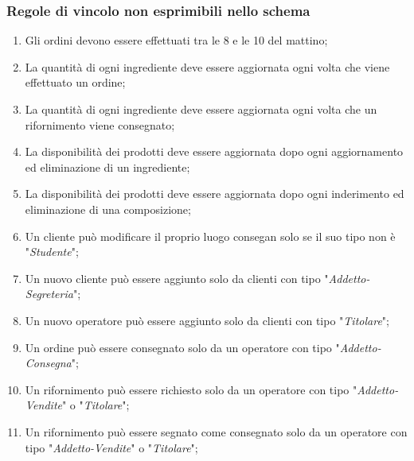 \documentclass[12pt,a4paper]{article}
\begin{document}
    \subsubsection{Regole di vincolo non esprimibili nello schema}
    \begin{enumerate}[leftmargin=3em,label=\textbf{(RV\arabic*)}]
        \item  Gli ordini devono essere effettuati tra le 8 e le 10 del mattino;
        \item La quantità di ogni ingrediente deve essere aggiornata ogni volta che viene effettuato un ordine;
        \item La quantità di ogni ingrediente deve essere aggiornata ogni volta che un rifornimento viene consegnato;
        \item La disponibilità dei prodotti deve essere aggiornata dopo ogni aggiornamento ed eliminazione di un ingrediente;
        \item La disponibilità dei prodotti deve essere aggiornata dopo ogni inderimento ed eliminazione di una composizione;
        \item Un cliente può modificare il proprio luogo consegan solo se il suo tipo non è "\textit{Studente}";
        \item Un nuovo cliente può essere aggiunto solo da clienti con tipo "\textit{Addetto-Segreteria}";
        \item Un nuovo operatore può essere aggiunto solo da clienti con tipo "\textit{Titolare}";
        \item Un ordine può essere consegnato solo da un operatore con tipo "\textit{Addetto-Consegna}";
        \item Un rifornimento può essere richiesto solo da un operatore con tipo "\textit{Addetto-Vendite}" o "\textit{Titolare}";
        \item Un rifornimento può essere segnato come consegnato solo da un operatore con tipo "\textit{Addetto-Vendite}" o "\textit{Titolare}";
    \end{enumerate}
\end{document}
